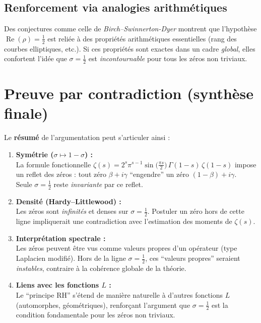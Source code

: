 \documentclass[11pt]{article}
\begin{document}
\subsection{Renforcement via analogies arithmétiques}
Des conjectures comme celle de \emph{Birch--Swinnerton-Dyer} montrent que l'hypothèse \(\operatorname{Re}(\rho)=\tfrac12\) est reliée à des propriétés arithmétiques essentielles (rang des courbes elliptiques, etc.). Si ces propriétés sont exactes dans un cadre \emph{global}, elles confortent l'idée que \(\sigma=\tfrac12\) est \emph{incontournable} pour tous les zéros non triviaux.

\section{Preuve par contradiction (synthèse finale)}
\label{sec:preuve_synthese}

Le \textbf{résumé} de l'argumentation peut s'articuler ainsi :

\begin{enumerate}
  \item \textbf{Symétrie (\(\sigma \mapsto 1-\sigma\)) :} 
  \\
  La formule fonctionnelle \(\zeta(s) = 2^s \pi^{s-1}\sin\bigl(\tfrac{\pi s}{2}\bigr)\,\Gamma(1-s)\,\zeta(1-s)\) impose un reflet des zéros : tout zéro \(\beta + i\gamma\) ``engendre'' un zéro \((1-\beta) + i\gamma\). \\
  Seule \(\sigma=\tfrac12\) reste \emph{invariante} par ce reflet.

  \item \textbf{Densité (Hardy--Littlewood) :} 
  \\
  Les zéros sont \emph{infinités} et denses sur \(\sigma=\tfrac12\). Postuler un zéro hors de cette ligne impliquerait une contradiction avec l'estimation des moments de \(\zeta(s)\).

  \item \textbf{Interprétation spectrale :} 
  \\
  Les zéros peuvent être vus comme valeurs propres d'un opérateur (type Laplacien modifié). Hors de la ligne \(\sigma=\tfrac12\), ces ``valeurs propres'' seraient \emph{instables}, contraire à la cohérence globale de la théorie.

  \item \textbf{Liens avec les fonctions $L$ :} 
  \\
  Le ``principe RH'' s'étend de manière naturelle à d'autres fonctions $L$ (automorphes, géométriques), renforçant l'argument que \(\sigma=\tfrac12\) est la condition fondamentale pour les zéros non triviaux.
\end{enumerate}
\end{document}
